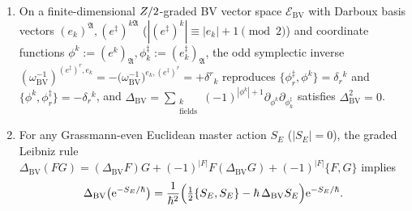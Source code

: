 \begin{lemma}[{Graded Darboux pairing $(\omega_{\mathrm{BV}}^{-1})^{\mathfrak{A}\mathfrak{B}}$, nilpotency $\Delta_{\mathrm{BV}}^2 = 0$, and the Euclidean QME}]
\label{lem:bv-abstract-indices}
\leavevmode
\begin{enumerate}[label=(\arabic*),leftmargin=*]
  \item On a finite-dimensional $Z/2$-graded BV vector space $\mathcal{E}_{\mathrm{BV}}$ with Darboux basis vectors $(e_k)^{\mathfrak{A}}, (e^\ddagger)^{k\mathfrak{A}}$ ($|(e^\ddagger)^k| \equiv |e_k| + 1 \pmod 2$) and coordinate functions $\phi^k := (e^k)_{\mathfrak{A}}, \phi^\ddagger_k := (e^\ddagger_k)_{\mathfrak{A}}$, the odd symplectic inverse $(\omega_{\mathrm{BV}}^{-1})^{(e^\ddagger)^r, e_k} = -\bigl(\omega_{\mathrm{BV}}^{-1}\bigr)^{e_k, (e^\ddagger)^r} = +\delta^r{}_k$ reproduces $\{\phi^\ddagger_r, \phi^k\} = \delta_r{}^k$ and $\{\phi^k, \phi^\ddagger_r\} = -\delta_r{}^k$, and $\Delta_{\mathrm{BV}} = \sum_{\substack{k\\\mathrm{fields}}}(-1)^{|\phi^k|+1}\partial_{\phi^k}\partial_{\phi^\ddagger_k}$ satisfies $\Delta_{\mathrm{BV}}^2 = 0$.

  \item For any Grassmann-even Euclidean master action $S_E$ ($|S_E| = 0$), the graded Leibniz rule $\Delta_{\mathrm{BV}}(F G) = (\Delta_{\mathrm{BV}}F)G + (-1)^{|F|}F(\Delta_{\mathrm{BV}}G) + (-1)^{|F|}\{F, G\}$ implies
  \[
  \Delta_{\mathrm{BV}}\bigl(\mathrm{e}^{-S_E/\hbar}\bigr) = \frac{1}{\hbar^2}\Bigl(\tfrac{1}{2}\{S_E, S_E\} - \hbar\,\Delta_{\mathrm{BV}}S_E\Bigr)\mathrm{e}^{-S_E/\hbar}.
  \]
\end{enumerate}
\end{lemma}


